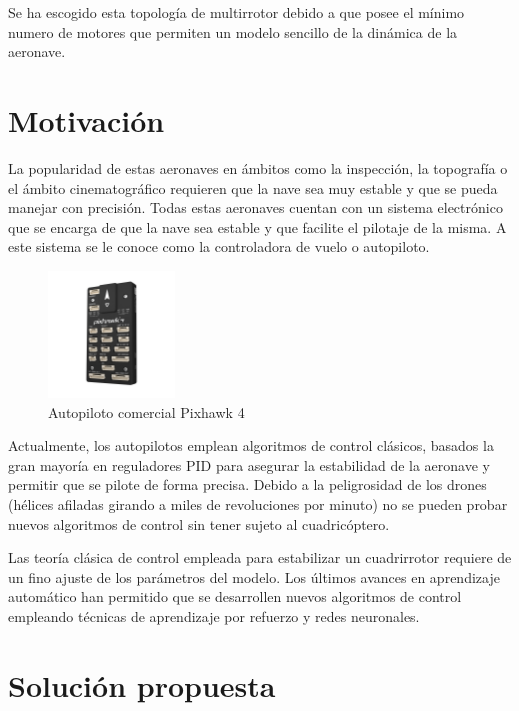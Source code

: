 Se ha escogido esta topología de multirrotor debido a que posee el mínimo numero de motores que permiten un modelo sencillo de la dinámica de la aeronave.

\section{Motivación}

La popularidad de estas aeronaves en ámbitos como la inspección, la topografía o el ámbito cinematográfico requieren que la nave sea muy estable y que se pueda manejar con precisión. 
Todas estas aeronaves cuentan con un sistema electrónico que se encarga de que la nave sea estable y que facilite el pilotaje de la misma. A este sistema se le conoce como la controladora de vuelo o autopiloto.

\begin{figure}[htb!]
	\centering
	\includegraphics[width=0.3\textwidth]{introduccion/pixhawk4.jpg}
	\caption{Autopiloto comercial Pixhawk 4}
	\label{pixhawk}
\end{figure}

Actualmente, los autopilotos emplean algoritmos de control clásicos, basados la gran mayoría en reguladores PID para asegurar la estabilidad de la aeronave y permitir que se pilote de forma precisa. Debido a la peligrosidad de los drones (hélices afiladas girando a miles de revoluciones por minuto) no se pueden probar nuevos algoritmos de control sin tener sujeto al cuadricóptero.

Las teoría clásica de control empleada para estabilizar un cuadrirrotor requiere de un fino ajuste de los parámetros del modelo. Los últimos avances en aprendizaje automático han permitido que se desarrollen nuevos algoritmos de control empleando técnicas de aprendizaje por refuerzo y redes neuronales.



\section{Solución propuesta}

